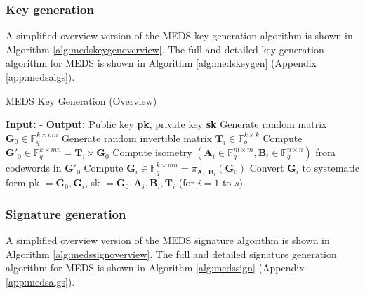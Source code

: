 \documentclass[11pt,a4paper]{report}
\theoremstyle{definition}
\begin{document}
\subsubsection{Key generation}
A simplified overview version of the MEDS key generation algorithm is shown in Algorithm \ref{alg:medskeygenoverview}. The full and detailed key generation algorithm for MEDS is shown in Algorithm \ref{alg:medskeygen} (Appendix \ref{app:medsalgs}).

\begin{algorithm}
  \caption{MEDS Key Generation (Overview)}
  \label{alg:medskeygenoverview}
  \begin{algorithmic}[1]
    \State \textbf{Input:} -
    \State \textbf{Output:} Public key \textbf{pk}, private key \textbf{sk}
    \State Generate random matrix $\textbf{G}_0 \in \mathbb{F}_q^{k \times mn}$
      \State Generate random invertible matrix $\textbf{T}_i \in \mathbb{F}_q^{k \times k}$
      \State Compute $\textbf{G}'_{0} \in \mathbb{F}_q^{k \times mn} = \textbf{T}_i \times \textbf{G}_0$
      \State Compute isometry $(\textbf{A}_i \in \mathbb{F}_q^{m \times m}, \textbf{B}_i \in \mathbb{F}_q^{n \times n})$ from codewords in $\textbf{G}'_{0}$
      \State Compute $\textbf{G}_i \in \mathbb{F}_q^{k \times mn} = \pi_{\textbf{A}_i, \textbf{B}_i}(\textbf{G}_0)$
      \State Convert $\textbf{G}_i$ to systematic form
    \EndFor
    \State \Return pk $= \textbf{G}_0, \textbf{G}_i$, sk $= \textbf{G}_0, \textbf{A}_i, \textbf{B}_i, \textbf{T}_i$ (for $i = 1$ to $s$)
  \end{algorithmic}
\end{algorithm}

\subsubsection{Signature generation}
A simplified overview version of the MEDS signature algorithm is shown in Algorithm \ref{alg:medssignoverview}. The full and detailed signature generation algorithm for MEDS is shown in Algorithm \ref{alg:medssign} (Appendix \ref{app:medsalgs}).
\end{document}
